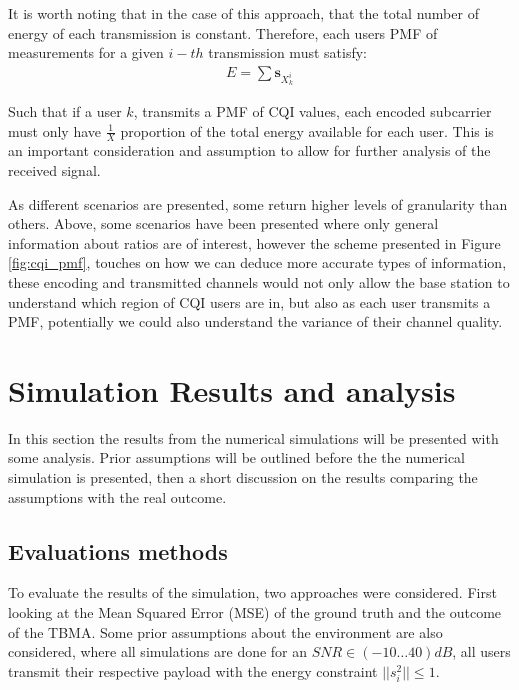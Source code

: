 \documentclass{article}
\begin{document}
It is worth noting that in the case of this approach, that the total number of energy of each transmission is constant. Therefore, each users PMF of measurements for a given $i-th$ transmission must satisfy:
\begin{align}
    E = \sum \boldsymbol{s}_{X^i_k} 
\end{align}

Such that if a user $k$, transmits a PMF of CQI values, each encoded subcarrier must only have $\frac{1}{X}$ proportion of the total energy available for each user. This is an important consideration and assumption to allow for further analysis of the received signal. 


As different scenarios are presented, some return higher levels of granularity than others. Above, some scenarios have been presented where only general information about ratios are of interest, however the scheme presented in Figure \ref{fig:cqi_pmf}, touches on how we can deduce more accurate types of information, these encoding and transmitted channels would not only allow the base station to understand which region of CQI users are in, but also as each user transmits a PMF, potentially we could also understand the variance of their channel quality. 


\section{Simulation Results and analysis}\label{sim_results}
In this section the results from the numerical simulations will be presented with some analysis. Prior assumptions will be outlined before the the numerical simulation is presented, then a short discussion on the results comparing the assumptions with the real outcome. 
\subsection{Evaluations methods}
To evaluate the results of the simulation, two approaches were considered. First looking at the Mean Squared Error (MSE) of the ground truth and the outcome of the TBMA.  Some prior assumptions about the environment are also considered, where all simulations are done for an $SNR \in (-10\dots40)dB$, all users transmit their respective payload with the energy constraint  $||s_{i}^2|| \leq 1$.  
\end{document}
